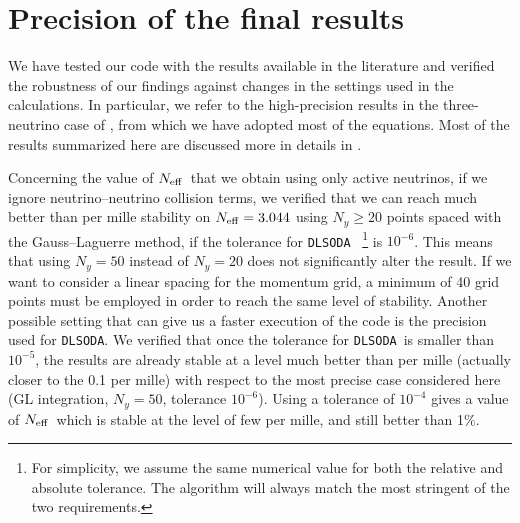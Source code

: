 \documentclass[notitlepage,nofootinbib,showpacs,preprintnumbers,amsmath,amssymb,superscriptaddress,prd,onecolumn]{revtex4-1}
\newcommand{\Neff}{\ensuremath{N_{\rm eff}}}
\newcommand{\dlsoda}{\texttt{DLSODA}}
\begin{document}
\section{Precision of the final results}
\label{ssec:precision}
We have tested our code with the results available in the literature and
verified the robustness of our findings against changes in the settings used in the calculations.
In particular, we refer to the high-precision results in the three-neutrino case of \cite{deSalas:2016ztq},
from which we have adopted most of the equations.
Most of the results summarized here are discussed more in details in \cite{Gariazzo:2019gyi,Bennett:2020zkv}.

Concerning the value of \Neff\ that we obtain using only active neutrinos,
if we ignore neutrino--neutrino collision terms,
we verified that we can reach much better than per mille stability on $\Neff=3.044$
using $N_y\geq20$ points spaced with the Gauss--Laguerre method,
if the tolerance for \dlsoda~%
\footnote{For simplicity, we assume the same numerical value for both the relative and absolute tolerance.
The algorithm will always match the most stringent of the two requirements.}
is $10^{-6}$.
This means that using $N_y=50$ instead of $N_y=20$ does not significantly alter the result.
If we want to consider a linear spacing for the momentum grid,
a minimum of 40 grid points must be employed in order to reach the same level of stability.
Another possible setting that can give us a faster execution of the code is the precision
used for \dlsoda.
We verified that once the tolerance for \dlsoda\ is smaller than $10^{-5}$,
the results are already stable at a level much better than per mille
(actually closer to the 0.1 per mille)
with respect to the most precise case considered here
(GL integration, $N_y=50$, tolerance $10^{-6}$).
Using a tolerance of $10^{-4}$ gives a value of \Neff\ which is stable
at the level of few per mille, and still better than 1\%.
\end{document}
